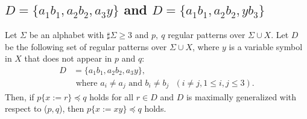 \subsection{$D = \{ a_{1}b_{1}, a_{2}b_{2}, a_{3}y\}$ and $D = \{ a_{1}b_{1}, a_{2}b_{2}, yb_{3}\}$}\label{subsec:d3b}


\begin{lem}\label{lem:3consts_i}
  Let $\Sigma$ be an alphabet with $\sharp\Sigma \ge 3$ and $p,~q$ regular patterns {\color{red}over} $\Sigma\cup X$.
  Let $D$ be the following set of regular patterns {\color{red}over} $\Sigma\cup X$, where $y$ is a variable symbol in $X$ that does not appear in $p$ and $q$:
  \begin{align*}
  D & = \{ a_{1}b_{1}, a_{2}b_{2}, a_{3}y\},\\
  & \mbox{ where } a_{i} \ne a_{j} \mbox{ and } b_{i} \ne b_{j} \mbox{ } (i\ne j, 1\le i,j\le 3).
  \end{align*}
  Then, if $p \{ x := r \} \preceq q$ holds for all $r \in D$ and $D$ is maximally generalized {\color{red}with respect to} ($p,q$), then $p \{ x := xy \} \preceq q$ holds.
\end{lem}

